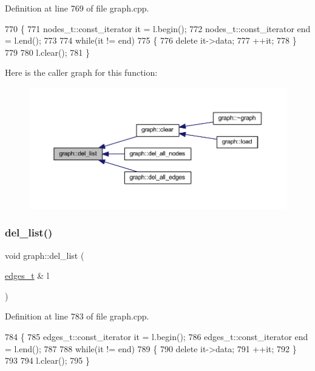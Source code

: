 Definition at line 769 of file graph.\+cpp.


\begin{DoxyCode}
770 \{
771     nodes\_t::const\_iterator it = l.begin();
772     nodes\_t::const\_iterator end = l.end();
773 
774     \textcolor{keywordflow}{while}(it != end)
775     \{
776     \textcolor{keyword}{delete} it->data;
777     ++it;
778     \}
779     
780     l.clear();
781 \}
\end{DoxyCode}
Here is the caller graph for this function\+:\nopagebreak
\begin{figure}[H]
\begin{center}
\leavevmode
\includegraphics[width=350pt]{classgraph_a23f0a5fb311b7d71bb9dfc4e8aedef35_icgraph}
\end{center}
\end{figure}
\mbox{\label{classgraph_a917feb07885dee30897d19691e1a7002}} 
\subsubsection{\texorpdfstring{del\+\_\+list()}{del\_list()}\hspace{0.1cm}{\footnotesize\ttfamily [2/2]}}
{\footnotesize\ttfamily void graph\+::del\+\_\+list (\begin{DoxyParamCaption}\item[{\mbox{\hyperlink{edge_8h_a8f9587479bda6cf612c103494b3858e3}{edges\+\_\+t}} \&}]{l }\end{DoxyParamCaption})\hspace{0.3cm}{\ttfamily [private]}}



Definition at line 783 of file graph.\+cpp.


\begin{DoxyCode}
784 \{
785     edges\_t::const\_iterator it = l.begin();
786     edges\_t::const\_iterator end = l.end();
787 
788     \textcolor{keywordflow}{while}(it != end)
789     \{
790     \textcolor{keyword}{delete} it->data;
791     ++it;
792     \}
793     
794     l.clear();
795 \}
\end{DoxyCode}
\mbox{\label{classgraph_a8bdc09d5b9ac4bd26586b054d8fcbe91}} 
